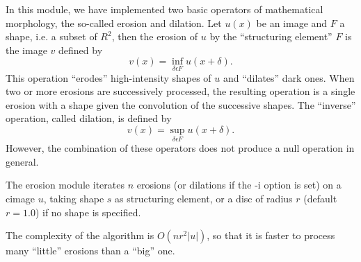 In this module, we have implemented two basic operators of mathematical 
morphology, the so-called erosion and dilation. Let $u(x)$ be an image 
and $F$ a shape, i.e. a subset of $R^2$, then the erosion of $u$ by the 
``structuring element'' $F$ is the image $v$ defined by
$$v(x) = \inf_{\delta \epsilon F} u(x+\delta).$$
This operation ``erodes'' high-intensity shapes of $u$ and ``dilates'' dark 
ones. 
When two or more erosions are successively processed, the resulting operation 
is a single erosion with a shape given the convolution of the successive 
shapes.
The ``inverse'' operation, called dilation, is defined by
$$v(x) = \sup_{\delta \epsilon F} u(x+\delta).$$
However, the combination of these operators does not produce a null 
operation in general.

The {\sf erosion} module iterates $n$ erosions (or dilations if the -i option 
is set) 
on a cimage $u$, taking shape $s$ as structuring element, or a disc of radius
$r$ (default $r=1.0$) if no shape is specified.

The complexity of the algorithm is $O(n r^2 |u|)$, so that it is faster to
process many ``little'' erosions than a ``big'' one. 

